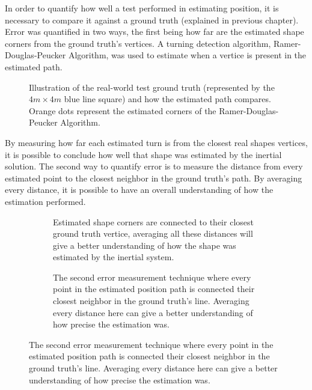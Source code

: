 In order to quantify how well a test performed in estimating position, it is necessary to compare it against a ground truth (explained in previous chapter). Error was quantified in two ways, the first being how far are the estimated shape corners from the ground truth's vertices. A turning detection algorithm, Ramer-Douglas-Peucker Algorithm, was used to estimate when a vertice is present in the estimated path.

\begin{figure}[!h]
    \centering
    \resizebox{0.8\linewidth}{!}{}
    \caption{Illustration of the real-world test ground truth (represented by the $4m\times 4m$  blue line square) and how the estimated path compares. Orange dots represent the estimated corners of the Ramer-Douglas-Peucker Algorithm. }
    \label{fig:square_truth}
\end{figure}

By measuring how far each estimated turn is from the closest real shapes vertices, it is possible to conclude how well that shape was estimated by the inertial solution.
The second way to quantify error is to measure the distance from every estimated point to the closest neighbor in the ground truth's path. By averaging every distance, it is possible to have an overall understanding of how the estimation performed.

\begin{figure}[!h]
    \centering
    \begin{subfigure}{0.75\textwidth}
        \centering
        \resizebox{1\linewidth}{!}{}
        \caption{Estimated shape corners are connected to their closest ground truth vertice, averaging all these distances will give a better understanding of how the shape was estimated by the inertial system.}
        \label{fig:square_turn}
    \end{subfigure}

    \begin{subfigure}{0.75\textwidth}
        \centering
        \resizebox{1\linewidth}{!}{}
        \caption{The second error measurement technique where every point in the estimated position path is connected their closest neighbor in the ground truth's line. Averaging every distance here can give a better understanding of how precise the estimation was.}
        \label{fig:square_point}
    \end{subfigure}
    \label{fig:error_methods}
\end{figure}

